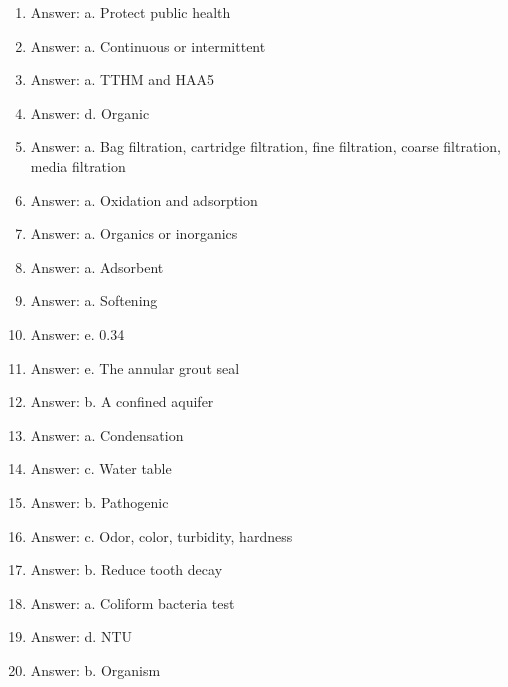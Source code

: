 \documentclass[10pt]{article}
\begin{document}
\begin{enumerate}



  


  \item Answer: a.  Protect public health
  
  \item Answer: a.  Continuous or intermittent

  \item Answer: a.  TTHM and HAA5
  
  \item Answer: d.  Organic

  \item Answer: a.  Bag filtration, cartridge filtration, fine filtration, coarse filtration, media filtration
  
  \item Answer: a.  Oxidation and adsorption

  \item Answer: a.  Organics or inorganics
  
  \item Answer: a.  Adsorbent
  
  \item Answer: a.  Softening

  \item Answer: e.  0.34%
  
  \item Answer: e.  The annular grout seal

  \item Answer: b.  A confined aquifer

  \item Answer: a.  Condensation

  \item Answer: c.  Water table
  
  \item Answer: b.  Pathogenic
  
  \item Answer: c.  Odor, color, turbidity, hardness
  
  \item Answer: b.  Reduce tooth decay
  
  \item Answer: a.  Coliform bacteria test
  
  \item Answer: d.  NTU
  
  \item Answer: b.  Organism
  

\end{enumerate}
\end{document}
